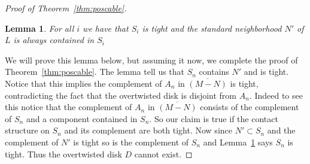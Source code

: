 \documentclass[11pt]{amsart}
\theoremstyle{plain}
\newtheorem{lemma}[theorem]{Lemma}
\theoremstyle{definition}
\theoremstyle{remark}
\numberwithin{theorem}{section}
\begin{document}
\begin{proof}[Proof of Theorem~\ref{thm:poscable}]
\begin{lemma}\label{claim1}
For all $i$ we have that $S_i$ is tight and the standard neighborhood $N'$ of $L$ is always contained in $S_i$
\end{lemma}
We will prove this lemma below, but assuming it now, we complete the proof of Theorem~\ref{thm:poscable}. The lemma tell us that $S_n$ contains $N'$ and is tight. Notice that this implies the complement of $A_n$ in $\overline{(M-N)}$ is tight, contradicting the fact that the overtwisted disk is disjoint from $A_n$. Indeed to see this notice that the complement of $A_n$ in $\overline{(M-N)}$ consists of the complement of $S_n$ and a component contained in $S_n$. So our claim is true if the contact structure on $S_n$ and its complement are both tight. Now since $N'\subset S_n$ and the complement of $N'$ is tight so is the complement of $S_n$ and Lemma~\ref{claim1} says $S_n$ is tight. Thus the overtwisted disk $D$ cannot exist.  
\end{proof}
\end{document}
